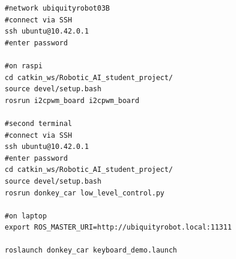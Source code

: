\documentclass[a4paper,11pt]{article}
\theoremstyle{mytheor}
\begin{document}
\begin{lstlisting}[label={list:first},caption=Sample rosBash code.]
#network ubiquityrobot03B
#connect via SSH
ssh ubuntu@10.42.0.1
#enter password

#on raspi
cd catkin_ws/Robotic_AI_student_project/
source devel/setup.bash
rosrun i2cpwm_board i2cpwm_board 

#second terminal 
#connect via SSH
ssh ubuntu@10.42.0.1
#enter password
cd catkin_ws/Robotic_AI_student_project/
source devel/setup.bash
rosrun donkey_car low_level_control.py

#on laptop
export ROS_MASTER_URI=http://ubiquityrobot.local:11311

roslaunch donkey_car keyboard_demo.launch
\end{lstlisting}
\end{document}
